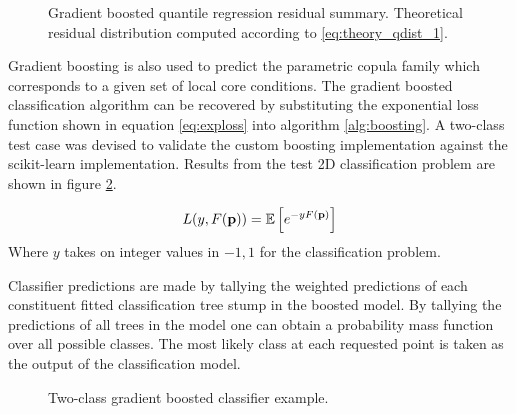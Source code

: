 \begin{figure}[H]%
    \centering
    \qquad
    \qquad
    \qquad
    \qquad
    \caption[Gradient boosted quantile regression residual summary.]{Gradient boosted quantile regression residual summary.  Theoretical residual distribution computed according to \ref{eq:theory_qdist_1}.} %
    \label{fig:gb2}%
\end{figure}

Gradient boosting is also used to predict the parametric copula family which corresponds to a given set of local core conditions.  The gradient boosted classification algorithm can be recovered by substituting the exponential loss function shown in equation \ref{eq:exploss} into algorithm \ref{alg:boosting}.   A two-class test case was devised to validate the custom boosting implementation against the scikit-learn implementation.  Results from the test 2D classification problem are shown in figure \ref{fig:gb3}.  

\begin{equation}
L(y, F(\mathbf p)) = \operatorname*{\mathbb{E}} \left[ e^{-yF(\mathbf p)}\right] 
\label{eq:exploss}
\end{equation} 
Where $y$ takes on integer values in ${-1, 1}$ for the classification problem.

Classifier predictions are made by tallying the weighted predictions of each constituent fitted classification tree stump in the boosted model.  By tallying the predictions of all trees in the model one can obtain a probability mass function over all possible classes.  The most likely class at each requested point is taken as the output of the classification model.

\begin{figure}[H]%
    \centering
    \qquad
    \caption[]{Two-class gradient boosted classifier example.}%
    \label{fig:gb3}%
\end{figure}

